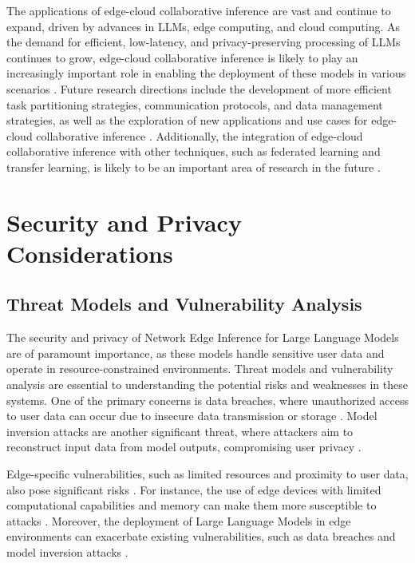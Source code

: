 \documentclass[11pt,a4paper]{article}
\begin{document}
The applications of edge-cloud collaborative inference are vast and continue to expand, driven by advances in LLMs, edge computing, and cloud computing. As the demand for efficient, low-latency, and privacy-preserving processing of LLMs continues to grow, edge-cloud collaborative inference is likely to play an increasingly important role in enabling the deployment of these models in various scenarios \cite{doi:10.32996/jcsts.2025.7.4.38}. Future research directions include the development of more efficient task partitioning strategies, communication protocols, and data management strategies, as well as the exploration of new applications and use cases for edge-cloud collaborative inference \cite{doi:10.1145/3788870}. Additionally, the integration of edge-cloud collaborative inference with other techniques, such as federated learning and transfer learning, is likely to be an important area of research in the future \cite{arxiv:2409.14961}.


\section{Security and Privacy Considerations}



\subsection{Threat Models and Vulnerability Analysis}


The security and privacy of Network Edge Inference for Large Language Models are of paramount importance, as these models handle sensitive user data and operate in resource-constrained environments. Threat models and vulnerability analysis are essential to understanding the potential risks and weaknesses in these systems. One of the primary concerns is data breaches, where unauthorized access to user data can occur due to insecure data transmission or storage \cite{doi:10.1109/hpec58863.2023.10363447}. Model inversion attacks are another significant threat, where attackers aim to reconstruct input data from model outputs, compromising user privacy \cite{doi:10.1109/sp61157.2025.00160}.

Edge-specific vulnerabilities, such as limited resources and proximity to user data, also pose significant risks \cite{doi:10.1109/comst.2025.3527641}. For instance, the use of edge devices with limited computational capabilities and memory can make them more susceptible to attacks \cite{arxiv:2409.00088}. Moreover, the deployment of Large Language Models in edge environments can exacerbate existing vulnerabilities, such as data breaches and model inversion attacks \cite{arxiv:2402.06196}.
\end{document}
